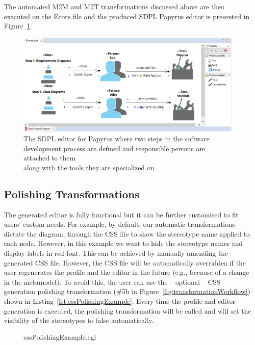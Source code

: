The automated M2M and M2T transformations discussed above are then executed on the Ecore file and the produced SDPL Papyrus editor is presented in Figure~\ref{fig:sdplEditor}.  

\begin{figure}[ht!]
	\centering
	\includegraphics[width=1\textwidth]{images/sdplEditor.png}
	\caption[]{The SDPL editor for Papyrus where two steps in the software 
		development process are defined and responsible persons are attached to 
		them\\ along with the tools they are specialized on.}
	\label{fig:sdplEditor}
\end{figure}

\subsection{Polishing Transformations}
The generated editor is fully functional but it can be further customised to fit users' custom needs. 
For example, by default, our automatic transformations dictate the diagram, through the CSS file to show the stereotype name applied to each node. 
However, in this example we want to hide the stereotype names and display labels in red font. 
This can be achieved by manually amending the generated CSS file. 
However, the CSS file will be automatically overridden if the user regenerates the profile and the editor in the future (e.g., because of a change in the metamodel). 
To avoid this, the user can use the -- optional -- CSS generation polishing transformation (\#5b in Figure~\ref{fig:transformationWorkflow}) shown in Listing~\ref{lst:cssPolishingExample}. 
Every time the profile and editor generation is executed, the polishing transformation will be called and will set the visibility of the stereotypes to false automatically. 

\begin{figure}
	
	{cssPolishingExample.egl}
\end{figure}


